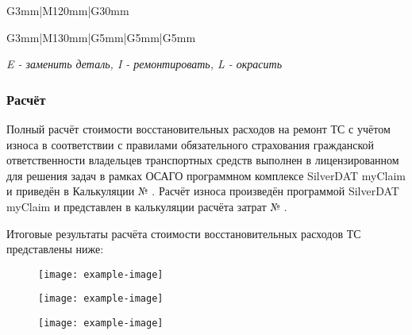 \begin{longtable}{G{3mm}|M{120mm}|G{30mm}}
\begin{longtable}{G{3mm}|M{130mm}|G{5mm}|G{5mm}|G{5mm}}
	 
	
	\textit{E - заменить деталь, I - ремонтировать, L - окрасить}
	
	
	\renewcommand\baselinestretch{1.2}\small\normalsize

\subsubsection{ Расчёт}
    
\indent Полный расчёт стоимости восстановительных расходов на ремонт ТС с учётом износа в соответствии с правилами обязательного страхования гражданской ответственности владельцев транспортных средств выполнен в  лицензированном для решения задач в рамках ОСАГО программном комплексе   SilverDAT myClaim и приведён в Калькуляции № \NomerDoc.
 Расчёт износа произведён программой  SilverDAT myClaim и представлен  в калькуляции расчёта затрат № \NomerDoc.
 
\indent Итоговые результаты расчёта  стоимости восстановительных расходов ТС \, \, представлены ниже:\\
  
  
\begin{figure}[H]
        	\centering
        	\texttt{[image: example-image]}
        \end{figure}
  
    \begin{figure}[H]
    	\centering
    	\texttt{[image: example-image]}
    \end{figure}
    \begin{figure}[H]
    	\centering
    	\texttt{[image: example-image]}
    \end{figure}
    \medskip
    \renewcommand\baselinestretch{1.2}\small\normalsize
    
    
%

    
%



\end{longtable}
\end{longtable}
